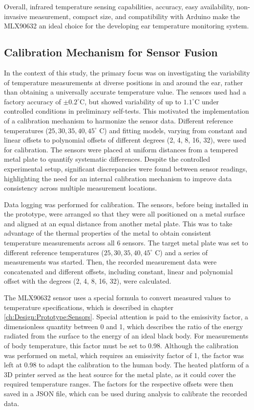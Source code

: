 Overall, infrared temperature sensing capabilities, accuracy, easy availability, non-invasive measurement, compact size, and compatibility with Arduino make the MLX90632 an ideal choice for the developing ear temperature monitoring system.

\subsection{Calibration Mechanism for Sensor Fusion}
\label{ch:Design:Prototype:Sensors:Calibration}
In the context of this study, the primary focus was on investigating the variability of temperature measurements at diverse positions in and around the ear, rather than obtaining a universally accurate temperature value. 
The sensors used had a factory accuracy of \( \pm0.2^\circ \text{C} \), but showed variability of up to \(1.1^\circ \text{C}\) under controlled conditions in preliminary self-tests. 
This motivated the implementation of a calibration mechanism to harmonize the sensor data. 
Different reference temperatures ($25, 30, 35, 40, 45^\circ$ C) and fitting models, varying from constant and linear offsets to polynomial offsets of different degrees (2, 4, 8, 16, 32), were used for calibration. 
The sensors were placed at uniform distances from a tempered metal plate to quantify systematic differences. 
Despite the controlled experimental setup, significant discrepancies were found between sensor readings, highlighting the need for an internal calibration mechanism to improve data consistency across multiple measurement locations.

Data logging was performed for calibration. 
The sensors, before being installed in the prototype, were arranged so that they were all positioned on a metal surface and aligned at an equal distance from another metal plate.
This was to take advantage of the thermal properties of the metal to obtain consistent temperature measurements across all 6 sensors.
The target metal plate was set to different reference temperatures ($25, 30, 35, 40, 45^\circ$ C) and a series of measurements was started.
Then, the recorded measurement data were concatenated and different offsets, including constant, linear and polynomial offset with the degrees (2, 4, 8, 16, 32), were calculated.

The MLX90632 sensor uses a special formula to convert measured values to temperature specifications, which is described in chapter \ref{ch:Design:Prototype:Sensors}.
Special attention is paid to the emissivity factor, a dimensionless quantity between 0 and 1, which describes the ratio of the energy radiated from the surface to the energy of an ideal black body.
For measurements of body temperature, this factor must be set to 0.98.
Although the calibration was performed on metal, which requires an emissivity factor of 1, the factor was left at 0.98 to adapt the calibration to the human body.
The heated platform of a 3D printer served as the heat source for the metal plate, as it could cover the required temperature ranges.
The factors for the respective offsets were then saved in a JSON file, which can be used during analysis to calibrate the recorded data.

